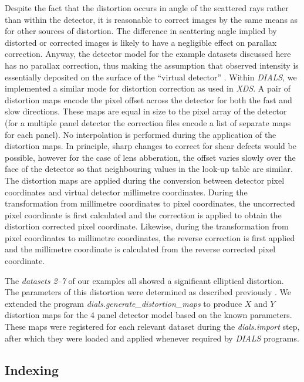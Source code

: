 \documentclass[preprint]{iucr}
\newcommand{\dials}{\emph{DIALS}\xspace}
\newcommand{\dialsimport}{\emph{dials.import}\xspace}
\newcommand{\xds}{\emph{XDS}\xspace}
\begin{document}
Despite the fact that the distortion occurs in angle of the scattered rays
rather than within the detector, it is reasonable to correct images by the same
means as for other sources of distortion. The difference in scattering angle
implied by distorted or corrected images is likely to have a negligible effect
on parallax correction. Anyway, the detector model for the example datasets
discussed here has no parallax correction, thus making the assumption that
observed intensity is essentially deposited on the surface of the ``virtual
detector'' \cite{Parkhurst2014}. Within \dials, we implemented a similar mode
for distortion correction as used in \xds. A pair of distortion maps encode the
pixel offset across the detector for both the fast and slow directions. These
maps are equal in size to the pixel array of the detector (for a multiple panel
detector the correction files encode a list of separate maps for each panel).
No interpolation is performed during the application of the distortion maps. In
principle, sharp changes to correct for shear defects would be possible,
however for the case of lens abberation, the offset varies slowly over the face
of the detector so that neighbouring values in the look-up table are similar.
The distortion maps are applied during the conversion between detector pixel
coordinates and virtual detector millimetre coordinates. During the
transformation from millimetre coordinates to pixel coordinates, the
uncorrected pixel coordinate is first calculated and the correction is applied
to obtain the distortion corrected pixel coordinate. Likewise, during the
transformation from pixel coordinates to millimetre coordinates, the reverse
correction is first applied and the millimetre coordinate is calculated from
the reverse corrected pixel coordinate.

The \emph{datasets 2--7} of our examples all showed a significant elliptical
distortion. The parameters of this distortion were determined as described
previously \cite{Clabbers2017}. We extended the program
\emph{dials.generate\_distortion\_maps}
to produce $X$ and $Y$ distortion maps for the 4 panel detector model based on
the known parameters. These maps were registered for each relevant dataset
during the \dialsimport step, after which they were loaded and applied
whenever required by \dials programs.

\subsection{Indexing}
\end{document}
